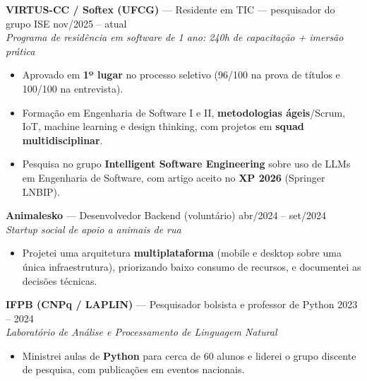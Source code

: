 \documentclass[10.5pt,a4paper]{article}
\newcommand{\cargo}[4]{%
  \Needspace*{5\baselineskip}%
  \textbf{#1} \textnormal{---} #2 \hfill \textnormal{#3}\\
  \textit{\small #4}\vspace{0.4ex}
}
\begin{document}
\cargo{VIRTUS-CC / Softex (UFCG)}{Residente em TIC --- pesquisador do grupo ISE}{nov/2025 --
atual}{Programa de residência em software de 1 ano: 240h de capacitação + imersão prática}
\begin{itemize}
  \item Aprovado em \textbf{1º lugar} no processo seletivo (96/100 na prova de títulos e 100/100 na
        entrevista).
  \item Formação em Engenharia de Software I e II, \textbf{metodologias ágeis}/Scrum, IoT, machine
        learning e design thinking, com projetos em \textbf{squad multidisciplinar}.
  \item Pesquisa no grupo \textbf{Intelligent Software Engineering} sobre uso de LLMs em Engenharia
        de Software, com artigo aceito no \textbf{XP 2026} (Springer LNBIP).
\end{itemize}

\cargo{Animalesko}{Desenvolvedor Backend (voluntário)}{abr/2024 -- set/2024}{Startup social de apoio
a animais de rua}
\begin{itemize}
  \item Projetei uma arquitetura \textbf{multiplataforma} (mobile e desktop sobre uma única
        infraestrutura), priorizando baixo consumo de recursos, e documentei as decisões técnicas.
\end{itemize}

\cargo{IFPB (CNPq / LAPLIN)}{Pesquisador bolsista e professor de Python}{2023 -- 2024}{Laboratório de
Análise e Processamento de Linguagem Natural}
\begin{itemize}
  \item Ministrei aulas de \textbf{Python} para cerca de 60 alunos e liderei o grupo discente de
        pesquisa, com publicações em eventos nacionais.
\end{itemize}

\end{document}
